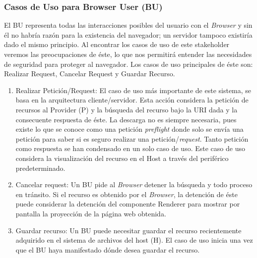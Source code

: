 \subsubsection{Casos de Uso para Browser User (BU)}
		El BU representa todas las interacciones posibles del usuario con el \textit{Browser} y sin él no habría razón para la existencia del navegador; un servidor tampoco existiría dado el mismo principio. Al encontrar los casos de uso de este stakeholder veremos las preocupaciones de éste, lo que nos permitirá entender las necesidades de seguridad para proteger al navegador. Los casos de uso principales de éste son: Realizar Request, Cancelar Request y Guardar Recurso.
			\begin{enumerate}	
				\item Realizar Petición/Request: El caso de uso más importante de este sistema, se basa en la arquitectura cliente/servidor. Esta acción considera la petición de recursos al Provider (P) y la búsqueda del recurso bajo la URI dada y la consecuente respuesta de éste. La descarga no es siempre necesaria, pues existe lo que se conoce como una petición \textit{preflight} donde solo se envía una petición para saber si es seguro realizar una petición/\textit{request}. Tanto petición como respuesta se han condensado en un solo caso de uso. Este caso de uso considera la visualización del recurso en el Host a través del periférico predeterminado.
				\item Cancelar request: Un BU pide al \textit{Browser} detener la búsqueda y todo proceso en tránsito. Si el recurso es obtenido por el \textit{Browser}, la detención de éste puede considerar la detención del componente Renderer para mostrar por pantalla la proyección de la página web obtenida.			
				\item Guardar recurso: Un BU puede necesitar guardar el recurso recientemente adquirido en el sistema de archivos del host (H). El caso de uso inicia una vez que el BU haya manifestado dónde desea guardar el recurso.
			\end{enumerate}


